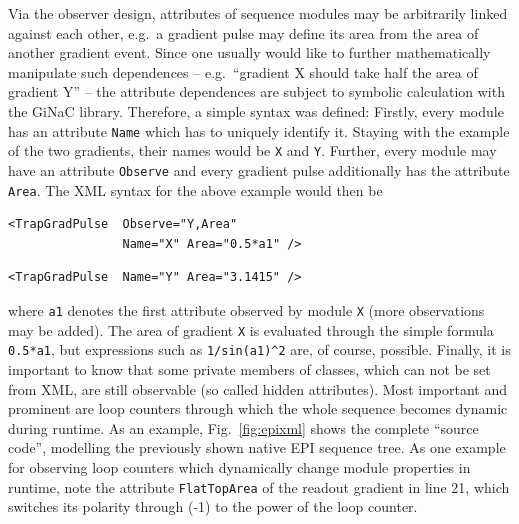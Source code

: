 \documentclass[journal,onecolumn,12pt]{IEEEtran}
\begin{document}
Via the observer design, attributes of sequence modules may be arbitrarily linked against each other, e.g.~a gradient pulse may define
its area from the area of another gradient event. Since one usually would like to further mathematically
manipulate such dependences -- e.g.~``gradient X should take half the area of gradient Y'' -- the attribute dependences are subject
to symbolic calculation with the GiNaC library. Therefore, a simple syntax was defined: Firstly, every module has an attribute
\verb+Name+ which has to uniquely identify it. Staying with the example of the two gradients, their names would be \verb+X+ and
\verb+Y+. Further, every module may have an attribute \verb+Observe+ and every gradient pulse additionally has the attribute \verb+Area+.
The XML syntax for the above example would then be

\begin{verbatim}
<TrapGradPulse  Observe="Y,Area"
                Name="X" Area="0.5*a1" />
\end{verbatim}
\begin{verbatim}
<TrapGradPulse  Name="Y" Area="3.1415" />
\end{verbatim}

where \verb+a1+ denotes the first attribute observed by module \verb+X+ (more observations may be added). The area of
gradient \verb+X+ is evaluated through the simple formula \verb+0.5*a1+, but expressions such as \verb+1/sin(a1)^2+ are,
of course, possible. Finally, it is important to know that some private members of classes, which can not be set from
XML, are still observable (so called hidden attributes). Most important and prominent are loop counters through which
the whole sequence becomes dynamic during runtime. As an example, Fig.~\ref{fig:epixml} shows the complete ``source
code'', modelling the previously shown native EPI sequence tree. As one example for observing loop counters which
dynamically change module properties in runtime, note the attribute \verb+FlatTopArea+ of the readout gradient in line
21, which switches its polarity through (-1) to the power of the loop counter.\\
\end{document}
